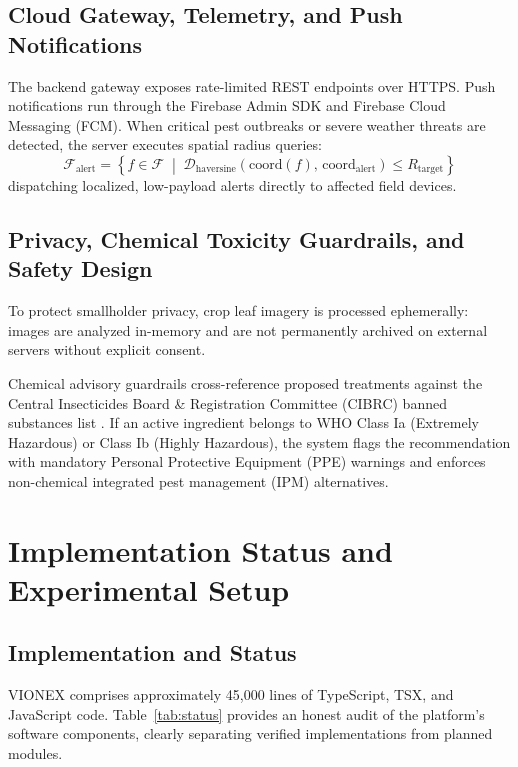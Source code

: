 \documentclass[conference]{IEEEtran}
\begin{document}
\subsection{Cloud Gateway, Telemetry, and Push Notifications}
The backend gateway exposes rate-limited REST endpoints over HTTPS. Push notifications run through the Firebase Admin SDK and Firebase Cloud Messaging (FCM). When critical pest outbreaks or severe weather threats are detected, the server executes spatial radius queries:
\begin{equation}
\mathcal{F}_{\text{alert}} = \left\{ f \in \mathcal{F} \;\middle|\; \mathcal{D}_{\text{haversine}}\left(\text{coord}(f),\, \text{coord}_{\text{alert}}\right) \le R_{\text{target}} \right\}
\end{equation}
dispatching localized, low-payload alerts directly to affected field devices.

\subsection{Privacy, Chemical Toxicity Guardrails, and Safety Design}
To protect smallholder privacy, crop leaf imagery is processed ephemerally: images are analyzed in-memory and are not permanently archived on external servers without explicit consent. 

Chemical advisory guardrails cross-reference proposed treatments against the Central Insecticides Board \& Registration Committee (CIBRC) banned substances list \cite{cibrc2024}. If an active ingredient belongs to WHO Class Ia (Extremely Hazardous) or Class Ib (Highly Hazardous), the system flags the recommendation with mandatory Personal Protective Equipment (PPE) warnings and enforces non-chemical integrated pest management (IPM) alternatives.

\section{Implementation Status and Experimental Setup}

\subsection{Implementation and Status}
VIONEX comprises approximately 45,000 lines of TypeScript, TSX, and JavaScript code. Table~\ref{tab:status} provides an honest audit of the platform's software components, clearly separating verified implementations from planned modules.
\end{document}
